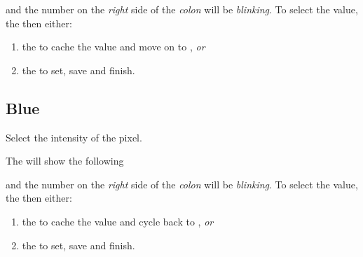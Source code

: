 and the number on the \textit{right} side of the \textit{colon} will be
\textit{blinking}.  To select the  value,  the  then
either:

\begin{enumerate}
  \item {} the  to cache the value and move on to ,
    \textit{or}
  \item {} the  to set, save and finish.
\end{enumerate}


\subsection{Blue} 

Select the intensity of the  pixel.

\par\medskip

The  will show the following

\begin{figure}[H]
\centering
\end{figure}

and the number on the \textit{right} side of the \textit{colon} will be
\textit{blinking}.  To select the  value,  the  then
either:

\begin{enumerate}
  \item {} the  to cache the value and cycle back to ,
    \textit{or}
  \item {} the  to set, save and finish.
\end{enumerate}

